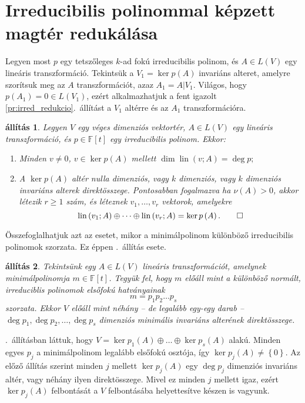 \documentclass[9pt, a4paper, showtrims]{memoir}
\makeatletter
\let\Aref\relax
\renewenvironment{proof}[1][\proofname]
    {\par\pushQED{\qed}%
    \normalfont \topsep6\p@\@plus6\p@\relax
    \trivlist
    \item[\hskip\labelsep
        \itshape
    #1\@addpunct{:}]\ignorespaces}
    {\popQED\endtrivlist\@endpefalse}
\theoremstyle{plain}
\newtheorem{proposition}{állítás}[chapter]
\theoremstyle{remark}
\theoremstyle{definition}
\DeclareMathOperator{\lin}{lin}
\makeatother
\begin{document}
    \section{Irreducibilis polinommal képzett magtér redukálása}
    Legyen most $p$ egy tetszőleges $k$-ad fokú irreducibilis polinom,
    és $A\in L(V)$ egy lineáris transzformáció.
    Tekintsük a $V_1=\ker p\left( A \right)$ invariáns alteret, amelyre szorítsuk meg az $A$
    transzformációt, azaz $A_1=A|V_1$.
    Világos, hogy $p\left( A_1 \right)=0\in L\left( V_1 \right)$, 
    ezért alkalmazhatjuk a fent igazolt \ref{pr:irred_redukcio}.~állítást
    a $V_1$ altérre és az $A_1$ transzformációra.
    \begin{proposition}
        Legyen $V$ egy véges dimenziós vektortér, $A\in L\left( V \right)$ egy lineáris transzformáció,
        és $p\in\mathbb{F}\left[ t \right]$ egy irreducibilis polinom.
        Ekkor:
        \begin{enumerate}
            \item Minden $v\neq 0$, $v\in\ker p\left( A \right)$ mellett
                \(
                \dim\lin(v;A)=\deg p;
                \)
            \item A $\ker p\left( A \right)$ altér nulla dimenziós,
                vagy $k$ dimenziós, vagy $k$ dimenziós invariáns alterek direktösszege.
                Pontosabban fogalmazva
                ha $\nu\left( A \right)>0$, akkor létezik $r\geq 1$ szám,
                és léteznek $v_1,\dots,v_r$ vektorok, amelyekre
                \[
                    \lin\left( v_1;A \right)\oplus\dots\oplus \lin\left( v_r;A \right)
                    =
                    \ker p\left( A \right).
                    \qedhere
                \]
        \end{enumerate}
    \end{proposition}
    Összefoglalhatjuk azt az esetet, 
    mikor a minimálpolinom különböző irreducibilis polinomok szorzata.
    Ez éppen .~állítás esete.
    \begin{proposition}
        Tekintsünk egy $A\in L\left( V \right)$ lineáris transzformációt,
        amelynek minimálpolinomja $m\in\mathbb{F}\left[ t \right]$.
        Tegyük fel, 
        hogy $m$ előáll mint a különböző normált, irreduciblis polinomok elsőfokú hatványainak
        \[
            m=p_1p_2\dots p_s
        \]
        szorzata.
        Ekkor $V$ előáll mint néhány -- de legalább egy-egy darab --
        $\deg p_1,\deg p_2,\dots,\deg p_s$ dimenziós minimális invariáns alterének direktösszege.
    \end{proposition}
    \begin{proof}
        \Aref{pr:redukcio-primfelbontas}.~állításban láttuk, 
        hogy $V=\ker p_1\left( A \right)\oplus\dots\oplus\ker p_s\left( A \right)$ alakú.
        Minden egyes $p_j$ a minimálpolinom legalább elsőfokú osztója, így $\ker p_j\left( A \right)\neq\left\{ 0 \right\}$.
        Az előző állítás szerint minden $j$ mellett $\ker p_j\left( A \right)$ egy $\deg p_j$
        dimenziós invariáns altér, vagy néhány ilyen direktösszege.
        Mivel ez minden $j$ mellett igaz, ezért $\ker p_j\left( A \right)$ felbontását a $V$ felbontásába helyettesítve készen is vagyunk.
    \end{proof}
\end{document}

